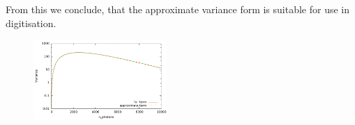 \documentclass[12pt]{article} %
\begin{document}
\begin{appendices}
From this we conclude, that the approximate variance form is suitable for use in digitisation.
%
%
\begin{figure}
\center
  \includegraphics[width=0.45\textwidth]{fig/comp_variance/variance}

\end{figure}
\end{appendices}
\end{document}
